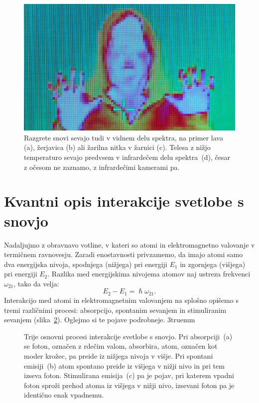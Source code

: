 \begin{figure}[ht]
\includegraphics[width=7truecm]{slike/11_photo_IR.jpg} 
\caption{Razgrete snovi sevajo tudi v 
vidnem delu spektra, na primer lava (a), žerjavica (b) ali 
žarilna nitka v žarnici (c). Telesa z nižjo temperaturo sevajo 
predvsem v infrardečem delu spektra~(d), česar z očesom ne zaznamo, z infrardečimi
kamerami pa.}
\label{fig:11_photoPlanck}
\end{figure}

\section{Kvantni opis interakcije svetlobe s snovjo}
Nadaljujmo z obravnavo votline, v kateri so atomi 
in elektromagnetno valovanje v termičnem ravnovesju. 
Zaradi enostavnosti privzamemo, da imajo atomi samo dva 
energijska nivoja, spodnjega (nižjega) pri energiji
$E_1$ in zgornjega (višjega) pri energiji $E_2$. 
Razlika med energijskima nivojema atomov naj ustreza
frekvenci $\omega_{21}$, tako da velja:
\begin{equation}
E_2 -E_1 = \hslash \omega_{21}.
\label{eq:11_07}
\end{equation}
Interakcijo med atomi in elektromagnetnim valovanjem na splošno
opišemo s tremi različnimi procesi: absorpcijo, spontanim
sevanjem in stimuliranim sevanjem (slika~\ref{fig:11_procesi}). 
Oglejmo si te pojave podrobneje.
\vglue3truemm
\begin{figure}[ht!]
\centering
\def\svgwidth{145truemm} 

\caption{Trije osnovni procesi interakcije svetlobe s snovjo. Pri absorpciji~(a) 
se foton, označen z rdečim valom, absorbira, atom, označen kot moder krožec, pa 
preide iz nižjega nivoja v višje. Pri spontani emisiji~(b) atom spontano preide 
iz višjega v nižji nivo in pri tem izseva foton. Stimulirana emisija~(c) pa je pojav,
pri katerem vpadni foton sproži prehod atoma iz višjega v nižji nivo, 
izsevani foton pa je identično enak vpadnemu.
}
\label{fig:11_procesi}
\end{figure}


